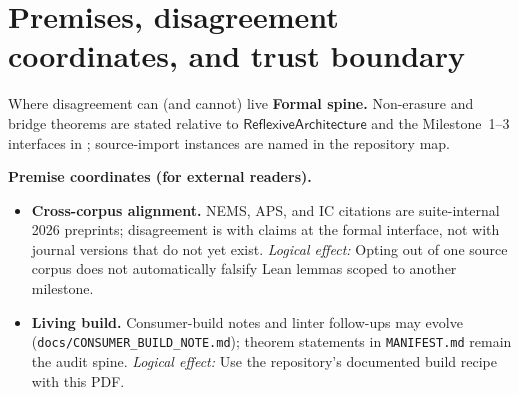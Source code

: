 \documentclass[11pt]{article}
\newcommand{\SemRem}{\ensuremath{\mathsf{SemanticRemainder}}}
\newcommand{\RAL}{\ensuremath{\mathsf{ReflexiveArchitecture}}}
\newcommand{\EnrIrr}{\ensuremath{\mathsf{EnrichedIrreducibility}}}
\begin{document}
\begin{abstract}
The summit result is: in any architecture in $\RAL$ satisfying the Milestone~3 layered
and coherence hypotheses and carrying a remainder-bearing internal theory, outer semantic
non-exhaustion, inner enriched irreducibility, and the full inner residue package hold
simultaneously and resist joint flattening.

A fourth milestone completes the program: the \textbf{LinkedArchitecture} class
proves both coherence axioms as theorems; \textbf{CrossCorpusInstance} makes the
cross-corpus biconditional $\EnrIrr \iff \exists T,\,\SemRem(T)$ hold definitionally;
and concrete source-import instances build \textbf{ReflexiveLayer Framework} directly
from \texttt{diagonal\_barrier\_rt} (NEMS record-truth undecidability as semantic remainder)
and \textbf{CertificationLayer} from IC enriched irreducibility via T-C+.7.
Zero proof placeholders at every level.  The program is complete.

\textbf{Trust boundary:} Milestone hypotheses and import bridges are explicit in the Lean strata; informal ``program complete'' summarizes those formal milestones, not all conceivable extensions of NEMS/APS/IC.

\NovaZenodoInAbstract
\end{abstract}

\section{Premises, disagreement coordinates, and trust boundary}\label{sec:premises-strata-synthesis}
\begin{keybox}{Where disagreement can (and cannot) live}
\textbf{Formal spine.}
Non-erasure and bridge theorems are stated relative to $\RAL$ and the Milestone~1--3 interfaces in ; source-import instances are named in the repository map.

\medskip
\textbf{Premise coordinates (for external readers).}
{\raggedright
\begin{itemize}[leftmargin=2em]
\item \textbf{Cross-corpus alignment.} NEMS, APS, and IC citations are suite-internal 2026 preprints; disagreement is with claims at the formal interface, not with journal versions that do not yet exist.
  \emph{Logical effect:} Opting out of one source corpus does not automatically falsify Lean lemmas scoped to another milestone.
\item \textbf{Living build.} Consumer-build notes and linter follow-ups may evolve (\texttt{docs/CONSUMER\_BUILD\_NOTE.md}); theorem statements in \texttt{MANIFEST.md} remain the audit spine.
  \emph{Logical effect:} Use the repository's documented build recipe with this PDF.
\end{itemize}
\par}
\end{keybox}
\end{document}
